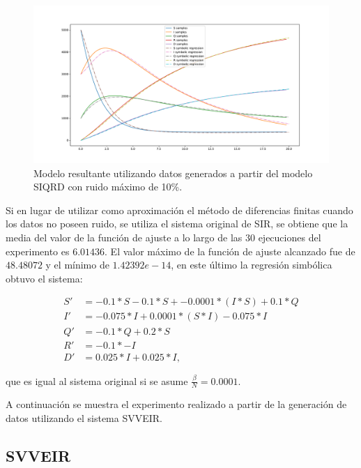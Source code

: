 \begin{figure}[h]
    \centering
    \includegraphics[width=\textwidth]{"figures/final_plot_SIQRD_0.1.pdf"}
    \caption{Modelo resultante utilizando datos generados a partir del modelo SIQRD con ruido máximo de 10\%.}
    \label{fig:final_plot_SIQRD_0.1}
\end{figure}

Si en lugar de utilizar como aproximación el método de diferencias finitas cuando los datos no poseen ruido, se utiliza el sistema original de SIR, se obtiene que la media del valor de la función de ajuste a lo largo de las 30 ejecuciones del experimento es $6.01436$. El valor máximo de la función de ajuste alcanzado fue de $48.48072$ y el mínimo de $1.42392e-14$, en este último la regresión simbólica obtuvo el sistema:

\begin{align*}
    S' & = -0.1 * S -0.1 * S + -0.0001 * (I * S) + 0.1 * Q \\
    I' & = -0.075 * I + 0.0001 * (S * I) -0.075 * I        \\
    Q' & = -0.1 * Q + 0.2 * S                              \\
    R' & = -0.1 * -I                                       \\
    D' & = 0.025 * I + 0.025 * I,
\end{align*}

que es igual al sistema original si se asume $\frac{\beta}{N} = 0.0001$.

A continuación se muestra el experimento realizado a partir de la generación de datos utilizando el sistema SVVEIR.

\subsection{SVVEIR}


